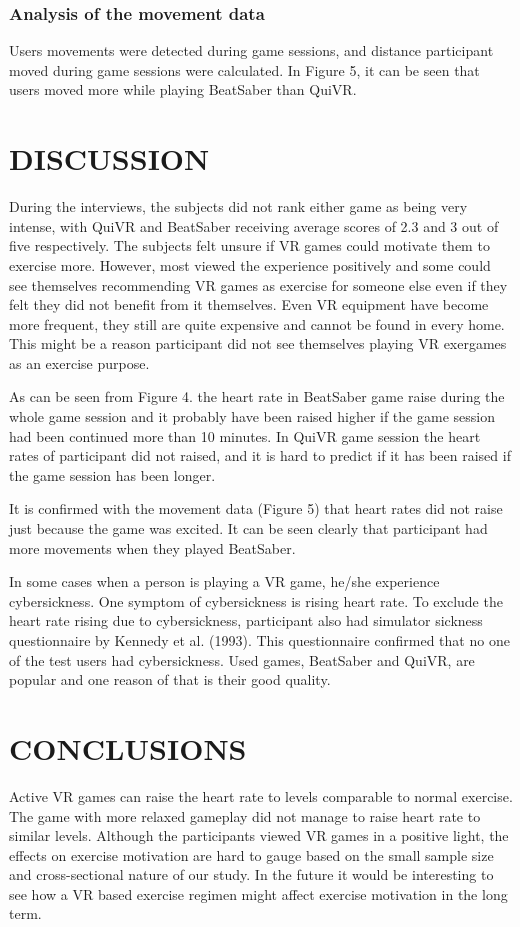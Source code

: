 \documentclass{sig-alternate-05-2015}
\begin{document}
\subsubsection{Analysis of the movement data}

Users movements were detected during game sessions, and distance participant 
moved during game sessions were calculated. In Figure 5, it can be seen that 
users moved more while playing BeatSaber than QuiVR.

\section{DISCUSSION}
During the interviews, the subjects did not rank either game as being very 
intense, with QuiVR and BeatSaber receiving average scores of 2.3 and 3 out 
of five respectively. The subjects felt unsure if VR games could motivate 
them to exercise more. However, most viewed the experience positively and 
some could see themselves recommending VR games as exercise for someone 
else even if they felt they did not benefit from it themselves. Even VR 
equipment have become more frequent, they still are quite expensive and 
cannot be found in every home. This might be a reason participant did 
not see themselves playing VR exergames as an exercise purpose.

As can be seen from Figure 4. the heart rate in BeatSaber game raise 
during the whole game session and it probably have been raised higher 
if the game session had been continued more than 10 minutes. In QuiVR 
game session the heart rates of participant did not raised, and it is 
hard to predict if it has been raised if the game session has been longer.

It is confirmed with the movement data (Figure 5) that heart rates did 
not raise just because the game was excited. It can be seen clearly that 
participant had more movements when they played BeatSaber. 

In some cases when a person is playing a VR game, he/she experience 
cybersickness. One symptom of cybersickness is rising heart rate. To 
exclude the heart rate rising due to cybersickness, participant also 
had simulator sickness questionnaire by Kennedy et al. (1993). This 
questionnaire confirmed that no one of the test users had cybersickness. 
Used games, BeatSaber and QuiVR, are popular and one reason of that is 
their good quality.

\section{CONCLUSIONS}
Active VR games can raise the heart rate to levels comparable to 
normal exercise. The game with more relaxed gameplay did not manage 
to raise heart rate to similar levels. Although the participants viewed 
VR games in a positive light, the effects on exercise motivation are 
hard to gauge based on the small sample size and cross-sectional nature 
of our study. In the future it would be interesting to see how a VR 
based exercise regimen might affect exercise motivation in the long term.  
\end{document}
